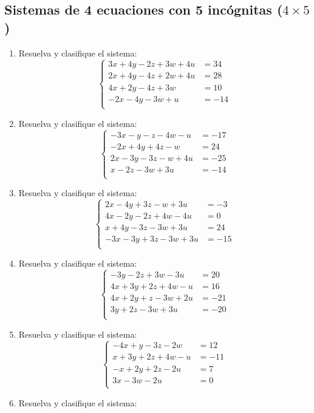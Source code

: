 \documentclass[11pt]{article}
\begin{document}
\subsection{Sistemas de 4 ecuaciones con 5 incógnitas ($ 4\times 5 $)}
\begin{enumerate}
\item Resuelva y clasifique el sistema:
\[
\left\{\begin{aligned}
3x+4y-2z+3w+4u&=34\\
2x+4y-4z+2w+4u&=28\\
4x+2y-4z+3w&=10\\
-2x-4y-3w+u&=-14\\
\end{aligned}\right.
\]
\item Resuelva y clasifique el sistema:
\[
\left\{\begin{aligned}
-3x-y-z-4w-u&=-17\\
-2x+4y+4z-w&=24\\
2x-3y-3z-w+4u&=-25\\
x-2z-3w+3u&=-14\\
\end{aligned}\right.
\]
\item Resuelva y clasifique el sistema:
\[
\left\{\begin{aligned}
2x-4y+3z-w+3u&=-3\\
4x-2y-2z+4w-4u&=0\\
x+4y-3z-3w+3u&=24\\
-3x-3y+3z-3w+3u&=-15\\
\end{aligned}\right.
\]
\item Resuelva y clasifique el sistema:
\[
\left\{\begin{aligned}
-3y-2z+3w-3u&=20\\
4x+3y+2z+4w-u&=16\\
4x+2y+z-3w+2u&=-21\\
3y+2z-3w+3u&=-20\\
\end{aligned}\right.
\]
\item Resuelva y clasifique el sistema:
\[
\left\{\begin{aligned}
-4x+y-3z-2w&=12\\
x+3y+2z+4w-u&=-11\\
-x+2y+2z-2u&=7\\
3x-3w-2u&=0\\
\end{aligned}\right.
\]
\item Resuelva y clasifique el sistema:

\end{enumerate}
\end{document}
